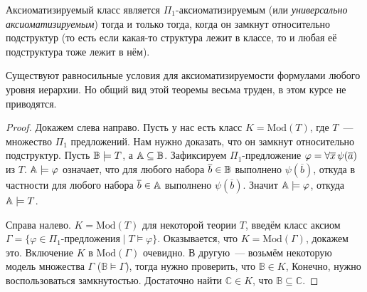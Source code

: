 \begin{theorem}
    Аксиоматизируемый класс является $\Pi_1$-аксиоматизируемым (или \emph{универсально аксиоматизируемым}) тогда и только тогда, когда он замкнут относительно подструктур (то есть если какая-то структура лежит в классе, то и любая её подструктура тоже лежит в нём).
\end{theorem}
\begin{remark}
    Существуют равносильные условия для аксиоматизируемости формулами любого уровня иерархии. Но общий вид этой теоремы весьма труден, в этом курсе не приводятся.
\end{remark}
\begin{proof}
    Докажем слева направо. Пусть у нас есть класс $K = \text{Mod}(T)$, где $T$~— множество $\Pi_1$ предложений. Нам нужно доказать, что он замкнут относительно подструктур.
    Пусть ${\mathbb B}\models T$, а ${\mathbb A}\subseteq{\mathbb B}$. Зафиксируем $\Pi_1$-предложение $\varphi=\forall\overline{x}\,\psi(\overline{a})$ из $T$. ${\mathbb A}\models\varphi$ означает, что для любого набора $\overline{b}\in{\mathbb B}$ выполнено $\psi(\overline{b})$, откуда в частности для любого набора $\overline{b}\in{\mathbb A}$ выполнено $\psi(\overline{b})$. Значит ${\mathbb A}\models\varphi$, откуда ${\mathbb A}\models T$.


    Справа налево. $K = \text{Mod}(T)$ для некоторой теории $T$, введём класс аксиом $\Gamma = \{\varphi \in \Pi_1\text{-предложения} \mid T \models \varphi\}$. Оказывается, что $K = \text{Mod}(\Gamma)$, докажем это. Включение $K$ в $\text{Mod}(\Gamma)$ очевидно. В другую~— возьмём некоторую модель множества $\Gamma$ ($\mathbb{B} \models \Gamma$), тогда нужно проверить, что $\mathbb{B} \in K$, Конечно, нужно воспользоваться замкнутостью. Достаточно найти $\mathbb{C} \in K$, что $\mathbb{B} \subseteq \mathbb{C}$. 


\end{proof}
